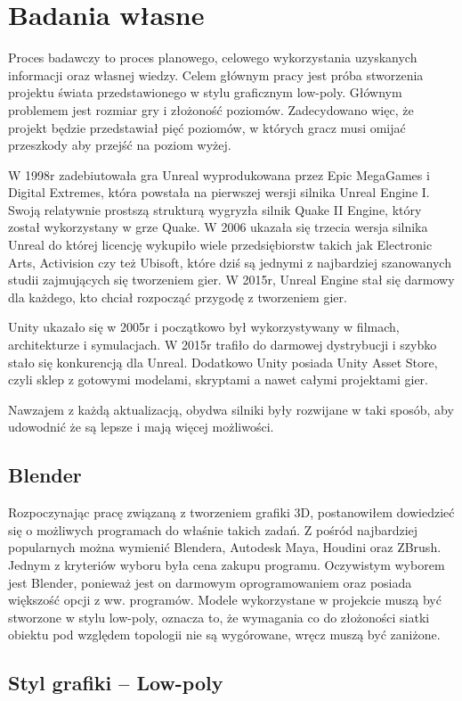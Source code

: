 \chapter{Badania własne}
\indent Proces badawczy to proces planowego, celowego wykorzystania uzyskanych informacji oraz własnej wiedzy. Celem głównym pracy jest próba stworzenia projektu świata przedstawionego w stylu graficznym low-poly. Głównym problemem jest rozmiar gry i złożoność poziomów. Zadecydowano więc, że projekt będzie przedstawiał pięć poziomów, w których gracz musi omijać przeszkody aby przejść na poziom wyżej.

\indent W 1998r zadebiutowała gra Unreal wyprodukowana przez Epic MegaGames i Digital Extremes, która powstała na pierwszej wersji silnika Unreal Engine I. Swoją relatywnie prostszą strukturą wygryzła silnik Quake II Engine, który został wykorzystany w grze Quake. W 2006 ukazała się trzecia wersja silnika Unreal do której licencję wykupiło wiele przedsiębiorstw takich jak Electronic Arts, Activision czy też Ubisoft, które dziś są jednymi z najbardziej szanowanych studii zajmujących się tworzeniem gier. W 2015r, Unreal Engine stał się darmowy dla każdego, kto chciał rozpocząć przygodę z tworzeniem gier.

\indent Unity ukazało się w 2005r i początkowo był wykorzystywany w filmach, architekturze i symulacjach. W 2015r trafiło do darmowej dystrybucji i szybko stało się konkurencją dla Unreal. Dodatkowo Unity posiada Unity Asset Store, czyli sklep z gotowymi modelami, skryptami a nawet całymi projektami gier.

\indent Nawzajem z każdą aktualizacją, obydwa silniki były rozwijane w taki sposób, aby udowodnić że są lepsze i mają więcej możliwości.
\section{Blender}
\indent Rozpoczynając pracę związaną z tworzeniem grafiki 3D, postanowiłem dowiedzieć się o możliwych programach do właśnie takich zadań. Z pośród najbardziej popularnych można wymienić Blendera, Autodesk Maya, Houdini oraz ZBrush. Jednym z kryteriów wyboru była cena zakupu programu. Oczywistym wyborem jest Blender, ponieważ jest on darmowym oprogramowaniem oraz posiada większość opcji z ww. programów. Modele wykorzystane w projekcie muszą być stworzone w stylu low-poly, oznacza to, że wymagania co do złożoności siatki obiektu pod względem topologii nie są wygórowane, wręcz muszą być zaniżone. 
\section{Styl grafiki -- Low-poly}

